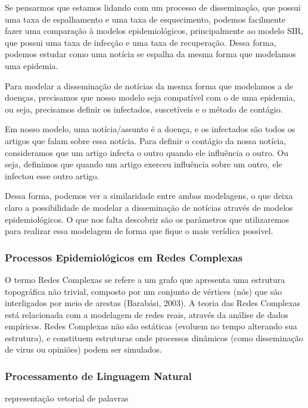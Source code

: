 \documentclass[a4paper,12pt]{article}
\begin{document}
Se pensarmos que estamos lidando com um processo de disseminação, que possui uma taxa de espalhamento e uma taxa de esquecimento, podemos
facilmente fazer uma comparação à modelos epidemiológicos, principalmente ao modelo SIR, que possui uma taxa de infecção e
uma taxa de recuperação. Dessa forma, podemos estudar como uma notícia se espalha da mesma forma que modelamos uma epidemia.

Para modelar a disseminação de notícias da mesma forma que modelamos a de doenças, precisamos
que nosso modelo seja compatível com o de uma epidemia, ou seja, precisamos definir os infectados, suscetíveis e o método de contágio.

Em nosso modelo, uma notícia/assunto é a doença, e os infectados são todos os artigos que falam sobre essa notícia. 
Para definir o contágio da nossa notícia, consideramos que um artigo infecta o outro quando ele influência o outro. Ou seja,
definimos que quando um artigo exerceu influência sobre um outro, ele infectou esse outro artigo. 

Dessa forma, podemos ver a similaridade entre ambas modelagens, o que deixa claro a possibilidade de modelar a disseminação de
notícias através de modelos epidemiológicos. O que nos falta descobrir são os parâmetros que utilizaremos para realizar essa modelagem
de forma que fique o mais verídica possível.

\subsubsection{Processos Epidemiológicos em Redes Complexas}

O termo Redes Complexas se refere a um grafo que apresenta uma estrutura topográfica não trivial, composto por um conjunto
 de vértices (nós) que são interligados por meio de arestas (Barabási, 2003). A teoria das Redes Complexas  está relacionada com a modelagem de redes reais, através da 
 análise de dados empíricos. Redes Complexas não são estáticas (evoluem no tempo alterando sua estrutura), e 
 constituem estruturas onde processos dinâmicos (como disseminação de virus ou opiniões) podem ser simulados.
 
 
\subsubsection{Processamento de Linguagem Natural}
\label{sec:nlp}

representação vetorial de palavras
\end{document}
